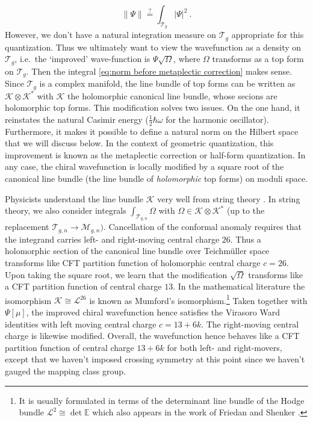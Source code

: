 \documentclass[12pt,a4paper]{article}
\newcommand{\be}{\begin{equation}}
\newcommand{\ee}{\end{equation}}
\newcommand\EE{\mathbb{E}}
\begin{document}
\be 
\lVert \Psi \rVert\overset{?}{=} \int_{\mathcal{T}_g} |\Psi|^2~. \label{eq:norm before metaplectic correction}
\ee
However, we don't have a natural integration measure on $\mathcal{T}_{g}$ appropriate for this quantization. Thus we ultimately want to view the wavefunction as a density on $\mathcal{T}_g$, i.e.~the `improved' wave-function is $\Psi\sqrt{\Omega}$, where $\Omega$ transforms as a top form on $\mathcal{T}_g$. Then the integral \eqref{eq:norm before metaplectic correction} makes sense. Since $\mathcal{T}_g$ is a complex manifold, the line bundle of top forms can be written as $\mathscr{K} \otimes \mathscr{K}^*$ with $\mathscr{K}$ the holomorphic canonical line bundle, whose secions are holomorphic top forms.
This modification solves two issues. On the one hand, it reinstates the natural Casimir energy ($\frac{1}{2}\hbar \omega$ for the harmonic oscillator). Furthermore, it makes it possible to define a natural norm on the Hilbert space that we will discuss below. In the context of geometric quantization, this improvement is known as the metaplectic correction or half-form quantization.
In any case, the chiral wavefunction is locally modified by a square root of the canonical line bundle (the line bundle of \emph{holomorphic} top forms) on moduli space.

Physicists understand the line bundle $\mathscr{K}$ very well from string theory \cite{Friedan:1986ua}. 
In string theory, we also consider integrals $\int_{\mathcal{T}_{g,n}} \Omega$ with $\Omega \in \mathscr{K} \otimes \mathscr{K}^*$ (up to the replacement $\mathcal{T}_{g,n} \to \mathcal{M}_{g,n})$.
Cancellation of the conformal anomaly requires that the integrand carries left- and right-moving central charge $26$. Thus a holomorphic section of the canonical line bundle over Teichm\"uller space transforms like CFT partition function of holomorphic central charge $c=26$. Upon taking the square root, we learn that the modification $\sqrt{\Omega}$ transforms like a CFT partition function of central charge $13$. In the mathematical literature the isomorphism $\mathscr{K} \cong \mathscr{L}^{26}$ is known as Mumford's isomorphism.\footnote{It is usually formulated in terms of the determinant line bundle of the Hodge bundle $\mathcal{L}^2 \cong \det \EE$ which also appears in the work of Friedan and Shenker \cite{Friedan:1986ua}.} Taken together with $\Psi[\mu]$, the improved chiral wavefunction hence satisfies the Virasoro Ward identities with left moving central charge $c=13+6k$. The right-moving central charge is likewise modified. Overall, the wavefunction hence behaves like a CFT partition function of central charge $13+6k$ for both left- and right-movers, except that we haven't imposed crossing symmetry at this point since we haven't gauged the mapping class group.
\end{document}
